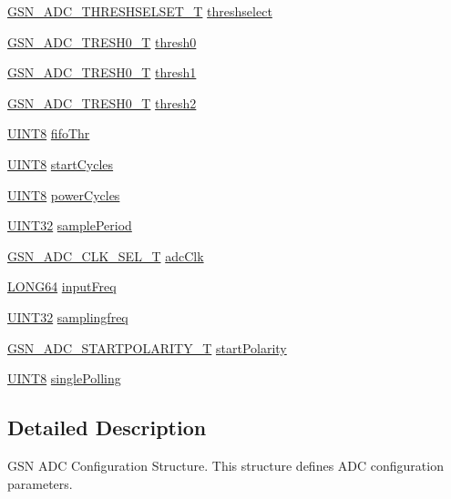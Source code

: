 \begin{DoxyCompactItemize}
\hyperlink{a00643_gaaac97c7455490c22d89a3f33ab7355d2}{GSN\_\-ADC\_\-THRESHSELSET\_\-T} \hyperlink{a00023_ae653bd57e4610763a968fdc6e2b6c1e1}{threshselect}
\item 
\hyperlink{a00026}{GSN\_\-ADC\_\-TRESH0\_\-T} \hyperlink{a00023_ad1b0e41c7d61cf5641accdee6717ea86}{thresh0}
\item 
\hyperlink{a00026}{GSN\_\-ADC\_\-TRESH0\_\-T} \hyperlink{a00023_a93585db848a7e64a531a78ccf0902baa}{thresh1}
\item 
\hyperlink{a00026}{GSN\_\-ADC\_\-TRESH0\_\-T} \hyperlink{a00023_a1aea5536e1a51f77062869186dda5dc7}{thresh2}
\item 
\hyperlink{a00660_gab27e9918b538ce9d8ca692479b375b6a}{UINT8} \hyperlink{a00023_abcb04a8b2727d552feab58429746beae}{fifoThr}
\item 
\hyperlink{a00660_gab27e9918b538ce9d8ca692479b375b6a}{UINT8} \hyperlink{a00023_a73879b0147fa5bccf8426e7ed992152c}{startCycles}
\item 
\hyperlink{a00660_gab27e9918b538ce9d8ca692479b375b6a}{UINT8} \hyperlink{a00023_aa408128ec811f37d608a5367f1adc0b3}{powerCycles}
\item 
\hyperlink{a00660_gae1e6edbbc26d6fbc71a90190d0266018}{UINT32} \hyperlink{a00023_a0751375e87151bb22632378129ce9257}{samplePeriod}
\item 
\hyperlink{a00643_ga36798ea9dfbf3935126b374c4dba00dd}{GSN\_\-ADC\_\-CLK\_\-SEL\_\-T} \hyperlink{a00023_a21f435c73f7e12852654e0d864ef487f}{adcClk}
\item 
\hyperlink{a00660_gae57305825c7d329ad8a3065ae045e875}{LONG64} \hyperlink{a00023_adf21af1b4c3574ceee0672561eecb346}{inputFreq}
\item 
\hyperlink{a00660_gae1e6edbbc26d6fbc71a90190d0266018}{UINT32} \hyperlink{a00023_a39c59a3009220218e522b97f632699ea}{samplingfreq}
\item 
\hyperlink{a00643_gaaafebe738a6902a342c1226ce5ea8598}{GSN\_\-ADC\_\-STARTPOLARITY\_\-T} \hyperlink{a00023_a54eafd5eda44389c4f6b5c87ca3cfcdc}{startPolarity}
\item 
\hyperlink{a00660_gab27e9918b538ce9d8ca692479b375b6a}{UINT8} \hyperlink{a00023_a4626fcb8594673b9212d4e9284b8b36c}{singlePolling}
\end{DoxyCompactItemize}


\subsection{Detailed Description}
GSN ADC Configuration Structure. This structure defines ADC configuration parameters. 


